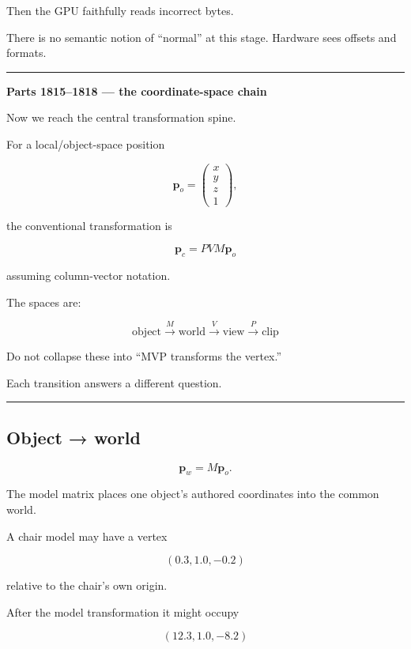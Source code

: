Then the GPU faithfully reads incorrect bytes.

There is no semantic notion of ``normal'' at this stage. Hardware sees offsets and formats.

\begin{center}\rule{0.5\linewidth}{0.5pt}\end{center}

\textbf{Parts 1815--1818 --- the coordinate-space chain}

Now we reach the central transformation spine.

For a local/object-space position

\[
\mathbf p_o=
\begin{pmatrix}
x\\y\\z\\1
\end{pmatrix},
\]

the conventional transformation is

\[
\boxed{
\mathbf p_c
=
PVM\mathbf p_o
}
\]

assuming column-vector notation.

The spaces are:

\[
\boxed{
\text{object}
\xrightarrow{M}
\text{world}
\xrightarrow{V}
\text{view}
\xrightarrow{P}
\text{clip}
}
\]

Do not collapse these into ``MVP transforms the vertex.''

Each transition answers a different question.

\begin{center}\rule{0.5\linewidth}{0.5pt}\end{center}

\subsection{Object → world}\label{03-visual-computing-i-ch012-object-world}

\[
\mathbf p_w=M\mathbf p_o.
\]

The model matrix places one object's authored coordinates into the common world.

A chair model may have a vertex

\[
(0.3,1.0,-0.2)
\]

relative to the chair's own origin.

After the model transformation it might occupy

\[
(12.3,1.0,-8.2)
\]

